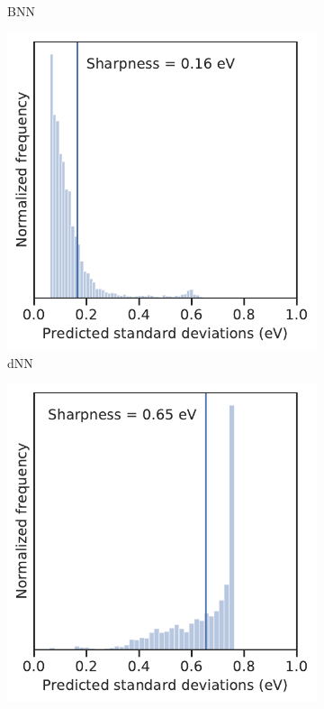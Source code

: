 \documentclass[]{achemso}
\begin{document}
\begin{figure}
\begin{subfigure}{0.32\textwidth}
        \caption{\gls{BNN}}\label{fig:sharpness_bnn}
    \end{subfigure}
    \begin{subfigure}{0.32\textwidth}
        \includegraphics[width=\textwidth]{../NNdNN/sharpness.pdf}
        \caption{\gls{dNN}}\label{fig:sharpness_dnn}
    \end{subfigure}
    \begin{subfigure}{0.32\textwidth}
        \includegraphics[width=\textwidth]{../GP/Matern/sharpness.pdf}

\end{subfigure}
\end{figure}
\end{document}
